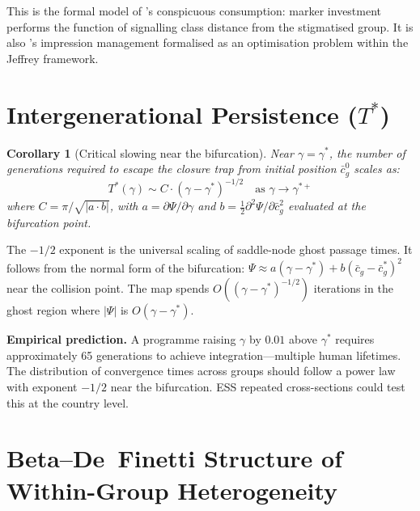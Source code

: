 \documentclass[12pt,a4paper]{article}
\newtheorem{corollary}[proposition]{Corollary}
\theoremstyle{definition}
\numberwithin{proposition}{subsection}
\begin{document}
This is the formal model of \citet{Veblen1899}'s conspicuous
consumption: marker investment performs the function of signalling
class distance from the stigmatised group. It is also
\citet{Goffman1959}'s impression management formalised as an
optimisation problem within the Jeffrey framework.

\section{Intergenerational Persistence (\texorpdfstring{$T^*$}{T*})}
\label{app:Tstar}

\begin{corollary}[Critical slowing near the bifurcation]
\label{cor:Tstar}
Near $\gamma = \gamma^*$, the number of generations required to
escape the closure trap from initial position $\bar{c}_g^0$ scales as:
\begin{equation}
  T^*(\gamma) \sim C \cdot (\gamma - \gamma^*)^{-1/2}
  \quad \text{as } \gamma \to \gamma^{*+}
  \label{eq:Tstar}
\end{equation}
where $C = \pi / \sqrt{|a \cdot b|}$, with $a = \partial \Psi /
\partial \gamma$ and $b = \frac{1}{2}\partial^2 \Psi / \partial
\bar{c}_g^2$ evaluated at the bifurcation point.
\end{corollary}

The $-1/2$ exponent is the universal scaling of saddle-node ghost
passage times. It follows from the normal form of the bifurcation:
$\Psi \approx a(\gamma - \gamma^*) + b(\bar{c}_g - \bar{c}_g^*)^2$ near the
collision point. The map spends $O((\gamma - \gamma^*)^{-1/2})$
iterations in the ghost region where $|\Psi|$ is $O(\gamma - \gamma^*)$.

\textbf{Empirical prediction.} A programme raising $\gamma$ by $0.01$
above $\gamma^*$ requires approximately 65 generations to achieve
integration---multiple human lifetimes. The distribution of
convergence times across groups should follow a power law with
exponent $-1/2$ near the bifurcation. ESS repeated cross-sections
could test this at the country level.

\section{Beta--De~Finetti Structure of Within-Group Heterogeneity}
\label{app:bernoulli}
\end{document}
